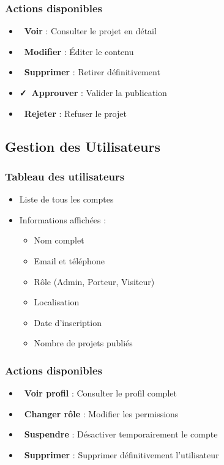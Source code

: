 \documentclass[12pt,a4paper]{article}
\begin{document}
\subsubsection{Actions disponibles}
\begin{itemize}[leftmargin=*]
    \item \textbf{\faEye\ Voir} : Consulter le projet en détail
    \item \textbf{\faEdit\ Modifier} : Éditer le contenu
    \item \textbf{\faTrash\ Supprimer} : Retirer définitivement
    \item \textbf{\faCheck\ Approuver} : Valider la publication
    \item \textbf{\faTimes\ Rejeter} : Refuser le projet
\end{itemize}

\subsection{Gestion des Utilisateurs}

\subsubsection{Tableau des utilisateurs}
\begin{itemize}[leftmargin=*]
    \item Liste de tous les comptes
    \item Informations affichées :
    \begin{itemize}
        \item Nom complet
        \item Email et téléphone
        \item Rôle (Admin, Porteur, Visiteur)
        \item Localisation
        \item Date d'inscription
        \item Nombre de projets publiés
    \end{itemize}
\end{itemize}

\subsubsection{Actions disponibles}
\begin{itemize}[leftmargin=*]
    \item \textbf{\faEye\ Voir profil} : Consulter le profil complet
    \item \textbf{\faUserShield\ Changer rôle} : Modifier les permissions
    \item \textbf{\faBan\ Suspendre} : Désactiver temporairement le compte
    \item \textbf{\faTrash\ Supprimer} : Supprimer définitivement l'utilisateur
\end{itemize}
\end{document}
